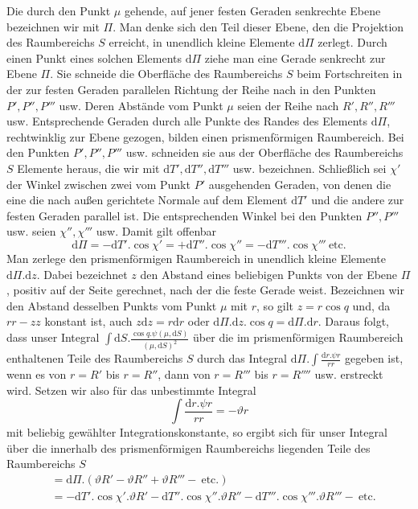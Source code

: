 Die durch den Punkt $\mu$ gehende, auf jener festen Geraden senkrechte Ebene bezeichnen wir mit $\Pi$. Man denke sich den Teil dieser Ebene, den die Projektion des Raumbereichs $S$ erreicht, in unendlich kleine Elemente $\mathrm{d}\Pi$ zerlegt. Durch einen Punkt eines solchen Elements $\mathrm{d}\Pi$ ziehe man eine Gerade senkrecht zur Ebene $\Pi$. Sie schneide die Oberfläche des Raumbereichs $S$ beim Fortschreiten in der zur festen Geraden parallelen Richtung der Reihe nach in den Punkten $P',P'',P'''$ usw. Deren Abstände vom Punkt $\mu$ seien der Reihe nach $R',R'',R'''$ usw. Entsprechende Geraden durch alle Punkte des Randes des Elements $\mathrm{d}\Pi$, rechtwinklig zur Ebene gezogen, bilden einen prismenförmigen Raumbereich. Bei den Punkten $P',P'',P'''$ usw. schneiden sie aus der Oberfläche des Raumbereichs $S$ Elemente heraus, die wir mit $\mathrm{d}T',\mathrm{d}T'',\mathrm{d}T'''$ usw. bezeichnen. Schließlich sei $\chi'$ der Winkel zwischen zwei vom Punkt $P'$ ausgehenden Geraden, von denen die eine die nach außen gerichtete Normale auf dem Element $\mathrm{d}T'$ und die andere zur festen Geraden parallel ist. Die entsprechenden Winkel bei den Punkten $P'',P'''$ usw. seien $\chi'',\chi'''$ usw. Damit gilt offenbar
\[
\mathrm{d}\Pi=-\mathrm{d}T'.\cos\chi'=+\mathrm{d}T''.\cos\chi''=-\mathrm{d}T'''.\cos\chi'''\ \text{etc.}
\]
Man zerlege den prismenförmigen Raumbereich in unendlich kleine Elemente $\mathrm{d}\Pi.\mathrm{d}z$. Dabei bezeichnet $z$ den Abstand eines beliebigen Punkts von der Ebene $\Pi$, positiv auf der Seite gerechnet, nach der die feste Gerade weist. Bezeichnen wir den Abstand desselben Punkts vom Punkt $\mu$ mit $r$, so gilt $z=r\cos q$ und, da $rr-zz$ konstant ist, auch $z\mathrm{d}z=r\mathrm{d}r$ oder $\mathrm{d}\Pi.\mathrm{d}z.\cos q=\mathrm{d}\Pi.\mathrm{d}r$. Daraus folgt, dass unser Integral $\int\mathrm{d}S.\frac{\cos q.\psi(\mu,\mathrm{d}S)}{(\mu,\mathrm{d}S)^2}$ über die im prismenförmigen Raumbereich enthaltenen Teile des Raumbereichs $S$ durch das Integral $\mathrm{d}\Pi.\int\frac{\mathrm{d}r.\psi r}{rr}$ gegeben ist, wenn es von $r=R'$ bis $r=R''$, dann von $r=R'''$ bis $r=R''''$ usw. erstreckt wird. Setzen wir also für das unbestimmte Integral
\[
\int\frac{\mathrm{d}r.\psi r}{rr}=-\vartheta r
\]
mit beliebig gewählter Integrationskonstante, so ergibt sich für unser Integral über die innerhalb des prismenförmigen Raumbereichs liegenden Teile des Raumbereichs $S$
\[
\begin{aligned}
&=\mathrm{d}\Pi.(\vartheta R'-\vartheta R''+\vartheta R'''-\ \text{etc.})\\
&=-\mathrm{d}T'.\cos\chi'.\vartheta R'-\mathrm{d}T''.\cos\chi''.\vartheta R''-\mathrm{d}T'''.\cos\chi'''.\vartheta R'''-\ \text{etc.}
\end{aligned}
\]

